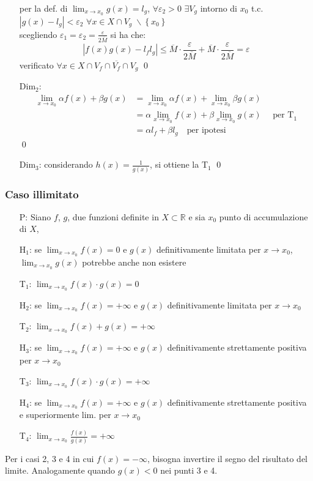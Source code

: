 \documentclass[a4paper]{article}
\begin{document}
\begin{itemize}
	per la def. di \(\displaystyle \lim_{x \to x_0} g(x) = l_g\), \(\forall \varepsilon_2 > 0\) \(\exists V_g\) intorno di \(x_0\) t.c. \(\left| g(x) - l_g \right| < \varepsilon_2\) \(\forall x \in X \cap V_g \; \backslash \left\{ x_0 \right\}\) \\
	scegliendo \(\displaystyle \varepsilon_1 = \varepsilon_2 = \frac{\varepsilon}{2 \overline{M}}\) si ha che:
	\[\left| f(x) g(x) - l_f l_g \right| \leq \overline{M} \cdot \frac{\varepsilon}{2 \overline{M}} + \overline{M} \cdot \frac{\varepsilon}{2 \overline{M}} = \varepsilon\]
	verificato \(\forall x \in X \cap V_f \cap \overline{V_f} \cap V_g\) \qed
	\item[Dim\(_2\):] 
	\begin{align*}
		\lim_{x \to x_0} \alpha f(x) + \beta g(x) &= \lim_{x \to x_0} \alpha f(x) + \lim_{x \to x_0} \beta g(x) \\
		&= \alpha \lim_{x \to x_0} f(x) + \beta \lim_{x \to x_0} g(x) \quad \text{ per T}_1 \\
		&= \alpha l_f + \beta l_g \quad \text{per ipotesi}
	\end{align*} \qed
	\item[Dim\(_3\):] considerando \(\displaystyle h(x) = \frac{1}{g(x)}\), si ottiene la T\(_1\) \qed
\end{itemize}

\newpage

\subsubsection*{Caso illimitato}
\begin{itemize}
	\item[P:] Siano \(f\), \(g\), due funzioni definite in \(X \subset \mathbb{R}\) e sia \(x_0\) punto di accumulazione di \(X\),
	\item[H\(_1\):] se \(\displaystyle \lim_{x \to x_0} f(x) = 0\) e \(g(x)\) definitivamente limitata per \(x \to x_0\), \(\displaystyle \lim_{x \to x_0} g(x)\) potrebbe anche non esistere
	\item[T\(_1\):] \(\displaystyle \lim_{x \to x_0} f(x) \cdot g(x) = 0\)
	\item[H\(_{2}\):] se \(\displaystyle \lim_{x \to x_0} f(x) = + \infty\) e \(g(x)\) definitivamente limitata per \(x \to x_0\)
	\item[T\(_{2}\):] \(\displaystyle \lim_{x \to x_0} f(x) + g(x) = + \infty\)
	\item[H\(_{3}\):] se \(\displaystyle \lim_{x \to x_0} f(x) = + \infty\) e \(g(x)\) definitivamente strettamente positiva per \(x \to x_0\)
	\item[T\(_{3}\):] \(\displaystyle \lim_{x \to x_0} f(x) \cdot g(x) = + \infty\)
	\item[H\(_{4}\):] se \(\displaystyle \lim_{x \to x_0} f(x) = + \infty\) e \(g(x)\) definitivamente strettamente positiva e superiormente lim. per \(x \to x_0\)
	\item[T\(_{4}\):] \(\displaystyle \lim_{x \to x_0} \frac{f(x)}{g(x)} = + \infty\)
\end{itemize}
Per i casi 2, 3 e 4 in cui \(f(x) = - \infty\), bisogna invertire il segno del risultato del limite. Analogamente quando \(g(x) < 0\) nei punti 3 e 4.
\end{document}
